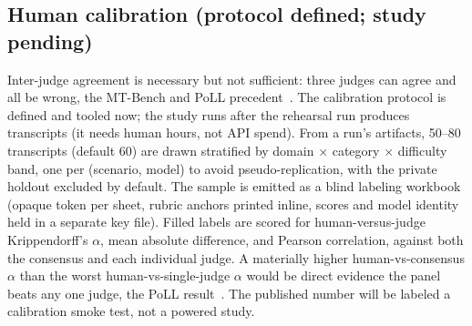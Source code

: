 \subsection{Human calibration (protocol defined; study pending)}

Inter-judge agreement is necessary but not sufficient: three judges can agree and
all be wrong, the MT-Bench and PoLL precedent~\cite{mtbench2023,poll2024}. The
calibration protocol is defined and tooled now; the study runs after the rehearsal
run produces transcripts (it needs human hours, not API spend). From a run's
artifacts, 50--80 transcripts (default 60) are drawn stratified by domain
$\times$ category $\times$ difficulty band, one per (scenario, model) to avoid
pseudo-replication, with the private holdout excluded by default. The sample is
emitted as a blind labeling workbook (opaque token per sheet, rubric anchors
printed inline, scores and model identity held in a separate key file). Filled
labels are scored for human-versus-judge Krippendorff's $\alpha$, mean absolute
difference, and Pearson correlation, against both the consensus and each individual
judge. A materially higher human-vs-consensus $\alpha$ than the worst
human-vs-single-judge $\alpha$ would be direct evidence the panel beats any one
judge, the PoLL result~\cite{poll2024}. The published number will be labeled a
calibration smoke test, not a powered study.
